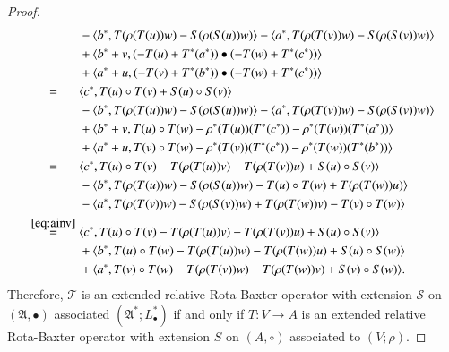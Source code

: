 \documentclass[12pt, reqno, a4paper]{amsart}
\theoremstyle{definition}
\begin{document}
\begin{proof}
\begin{align*}
		& - \langle b^*, T(\rho(T(u))w) - S(\rho(S(u))w)\rangle - \langle a^*, T(\rho(T(v))w) - S(\rho (S(v))w) \rangle                                  \\
		& + \langle b^* + v, (-T(u) + T^*(a^*)) \bullet (-T(w) + T^*(c^*)) \rangle \\
		& + \langle a^* + u, (-T(v) + T^*(b^*)) \bullet (-T(w) + T^*(c^*))  \rangle \\
		\overset{\hphantom{\eqref{eq:ainv}}}{=}\; & \langle c^*, T(u) \circ T(v) + S(u) \circ S(v) \rangle \\
		& - \langle b^*, T(\rho(T(u))w) - S(\rho(S(u))w)\rangle - \langle a^*, T(\rho(T(v))w) - S(\rho(S(v))w) \rangle \\
		& + \langle b^* + v, T(u) \circ T(w) - \rho^*(T(u))(T^*(c^*)) - \rho^*(T(w))(T^*(a^*)) \rangle \\
		& + \langle a^* + u, T(v) \circ T(w)  - \rho^*(T(v))(T^*(c^*)) - \rho^*(T(w))(T^*(b^*))  \rangle \\
		\overset{\hphantom{\eqref{eq:ainv}}}{=}\; & \langle c^*, T(u) \circ T(v) - T(\rho(T(u))v) - T(\rho(T(v))u) + S(u) \circ S(v) \rangle \\
		& - \langle b^*, T(\rho(T(u))w)   - S(\rho(S(u))w) - T(u) \circ T(w) + T(\rho(T(w))u) \rangle \\
		& - \langle a^*, T(\rho(T(v))w) - S(\rho(S(v))w)  + T(\rho(T(w))v) - T(v) \circ T(w) \rangle \\
		\overset{\eqref{eq:ainv}}{=}\; & \langle c^*, T(u) \circ T(v) - T(\rho(T(u))v) - T(\rho(T(v))u) + S(u) \circ S(v) \rangle \\
		& + \langle b^*, T(u) \circ T(w)  - T(\rho(T(u))w) - T(\rho(T(w))u)  + S(u) \circ S(w) \rangle \\
		& + \langle a^*,  T(v) \circ T(w) - T(\rho(T(v))w) - T(\rho(T(w))v)  + S(v) \circ S(w) \rangle.
	\end{align*}
	Therefore, $\mathcal{T}$ is an extended relative Rota-Baxter operator with extension $\mathcal{S}$ on $(\mathfrak{A}, \bullet)$ associated $(\mathfrak{A}^*; L_{\bullet}^*)$ if and only if $T: V \to A$ is an extended relative Rota-Baxter operator with extension $S$ on $(A, \circ)$ associated to $(V; \rho)$.
\end{proof}
\end{document}

